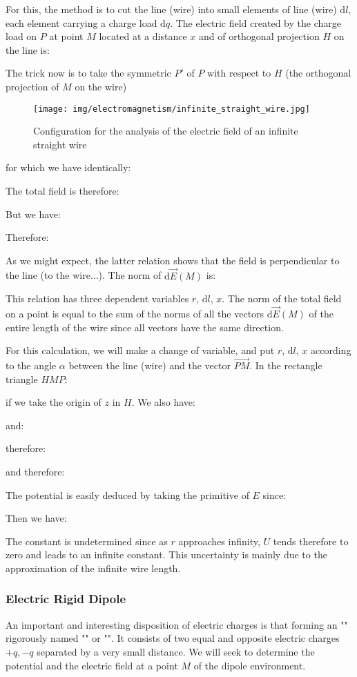 	For this, the method is to cut the line (wire) into small elements of line (wire) $\mathrm{d}l$, each element carrying a charge load $\mathrm{d}q$.  The electric field created by the charge load on $P$ at point $M$ located at a distance $x$ and of orthogonal projection $H$ on the line is:
	
	The trick now is to take the symmetric $P'$ of $P$ with respect to $H$ (the orthogonal projection of $M$ on the wire)
	\begin{figure}[H]
		\centering
		\texttt{[image: img/electromagnetism/infinite\_straight\_wire.jpg]}
		\caption{Configuration for the analysis of the electric field of an infinite straight wire}
	\end{figure}
	for which we have identically:
	
	The total field is therefore:
	
	But we have:
	
	Therefore:
	
	As we might expect, the latter relation shows that the field is perpendicular to the line (to the wire...).
	The norm of $\mathrm{d}\vec{E}(M)$ is:
	
	This relation has three dependent variables $r$, $\mathrm{d}l$, $x$. The norm of the total field on a point is equal to the sum of the norms of all the vectors $\mathrm{d}\vec{E}(M)$ of the entire length of the wire since all vectors have the same direction.
	
	For this calculation, we will make a change of variable, and put $r$, $\mathrm{d}l$, $x$ according to the angle $\alpha$ between the line (wire) and the vector $\overrightarrow{PM}$. In the rectangle triangle $HMP$:
	
	if we take the origin of $z$ in $H$. We also have:
	
	and:
	
	therefore:
	
	
	and therefore:
	
	The potential is easily deduced by taking the primitive of $E$ since:
	
	Then we have:
	
	The constant is undetermined since as $r$ approaches infinity, $U$ tends therefore to zero and leads to an infinite constant. This uncertainty is mainly due to the approximation of the infinite wire length.

	\subsubsection{Electric Rigid Dipole}\label{electric rigid dipole}
	An important and interesting disposition of electric charges is that forming an "" rigorously named "" or "". It consists of two equal and opposite electric charges $+ q, -q$ separated by a very small distance. We will seek to determine the potential and the electric field at a point $M$ of the dipole environment.
	
